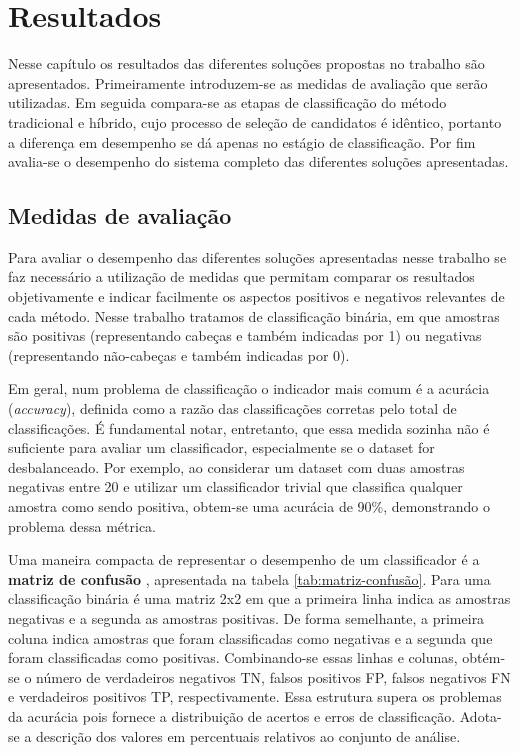 \chapter{Resultados} \label{chap:resultados}
Nesse capítulo os resultados das diferentes soluções propostas no trabalho são apresentados. Primeiramente introduzem-se as medidas de avaliação que serão utilizadas. Em seguida compara-se as etapas de classificação do método tradicional e híbrido, cujo processo de seleção de candidatos é idêntico, portanto a diferença em desempenho se dá apenas no estágio de classificação. Por fim avalia-se o desempenho do sistema completo das diferentes soluções apresentadas.

\section{Medidas de avaliação}
Para avaliar o desempenho das diferentes soluções apresentadas nesse trabalho se faz necessário a utilização de medidas que permitam comparar os resultados objetivamente e indicar facilmente os aspectos positivos e negativos relevantes de cada método. Nesse trabalho tratamos de classificação binária, em que amostras são positivas (representando cabeças e também indicadas por 1) ou negativas (representando não-cabeças e também indicadas por 0). 

Em geral, num problema de classificação o indicador mais comum é a acurácia (\textit{accuracy}), definida \cite{evaluationMetrics} como a razão das classificações corretas pelo total de classificações. É fundamental notar, entretanto, que essa medida sozinha não é suficiente para avaliar um classificador, especialmente se o dataset for desbalanceado. Por exemplo, ao considerar um dataset com duas amostras negativas entre 20 e utilizar um classificador trivial que classifica qualquer amostra como sendo positiva, obtem-se uma acurácia de 90\%, demonstrando o problema dessa métrica.

Uma maneira compacta de representar o desempenho de um classificador é a \textbf{matriz de confusão} \cite{evaluationMetrics}, apresentada na tabela \ref{tab:matriz-confusão}. Para uma classificação binária é uma matriz 2x2 em que a primeira linha indica as amostras negativas e a segunda as amostras positivas. De forma semelhante, a primeira coluna indica amostras que foram classificadas como negativas e a segunda que foram classificadas como positivas. Combinando-se essas linhas e colunas, obtém-se o número de verdadeiros negativos TN, falsos positivos FP, falsos negativos FN e verdadeiros positivos TP, respectivamente. Essa estrutura supera os problemas da acurácia pois fornece a distribuição de acertos e erros de classificação. Adota-se a descrição dos valores em percentuais relativos ao conjunto de análise.

